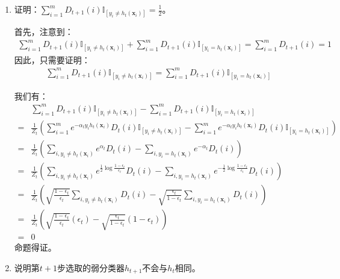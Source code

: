 \documentclass[12pt, a4paper]{article}
\newcommand{\vv}[1]{{\bm{#1}}}
\newcommand{\unit}{{\mathbb{I}}}
\begin{document}
        \begin{enumerate}

        \item 证明：$\sum_{i = 1}^{m} D_{t + 1}(i) \unit_{[y_i \ne h_t(\vv{x}_i)]} = \frac{1}{2}$。

            首先，注意到：
            \begin{align*}
            \sum_{i = 1}^{m} D_{t + 1}(i) \unit_{[y_i \ne h_t(\vv{x}_i)]} + \sum_{i = 1}^{m} D_{t + 1}(i) \unit_{[y_i = h_t(\vv{x}_i)]} = \sum_{i = 1}^{m} D_{t + 1}(i) = 1
            \end{align*}
            因此，只需要证明：
            \begin{align*}
            \sum_{i = 1}^{m} D_{t + 1}(i) \unit_{[y_i \ne h_t(\vv{x}_i)]} = \sum_{i = 1}^{m} D_{t + 1}(i) \unit_{[y_i = h_t(\vv{x}_i)]}
            \end{align*}

            我们有：
            \begin{align*}
            &\sum_{i = 1}^{m} D_{t + 1}(i) \unit_{[y_i \ne h_t(\vv{x}_i)]} - \sum_{i = 1}^{m} D_{t + 1}(i) \unit_{[y_i = h_t(\vv{x}_i)]} \\
            =& \frac{1}{Z_t} (\sum_{i = 1}^{m} e^{-\alpha_t y_i h_t(\vv{x}_i)} D_{t}(i) \unit_{[y_i \ne h_t(\vv{x}_i)]} - \sum_{i = 1}^{m} e^{-\alpha_t y_i h_t(\vv{x}_i)} D_{t}(i) \unit_{[y_i = h_t(\vv{x}_i)]}) \\
            =& \frac{1}{Z_t} (\sum_{i, y_i \ne h_t(\vv{x}_i)} e^{\alpha_t} D_{t}(i) - \sum_{i, y_i = h_t(\vv{x}_i)} e^{-\alpha_t} D_{t}(i)) \\
            =& \frac{1}{Z_t} (\sum_{i, y_i \ne h_t(\vv{x}_i)} e^{\frac{1}{2} \log \frac{1 - \epsilon_t}{\epsilon_t}} D_{t}(i) - \sum_{i, y_i = h_t(\vv{x}_i)} e^{-\frac{1}{2} \log \frac{1 - \epsilon_t}{\epsilon_t}} D_{t}(i)) \\
            =& \frac{1}{Z_t} (\sqrt{\frac{1 - \epsilon_t}{\epsilon_t}} \sum_{i, y_i \ne h_t(\vv{x}_i)} D_{t}(i) - \sqrt{\frac{\epsilon_t}{1 - \epsilon_t}} \sum_{i, y_i = h_t(\vv{x}_i)} D_{t}(i)) \\
            =& \frac{1}{Z_t} (\sqrt{\frac{1 - \epsilon_t}{\epsilon_t}} (\epsilon_t) - \sqrt{\frac{\epsilon_t}{1 - \epsilon_t}} (1 - \epsilon_t)) \\
            =& 0
            \end{align*}
            命题得证。

        \item 说明第$t + 1$步选取的弱分类器$h_{t + 1}$不会与$h_t$相同。


\end{enumerate}
\end{document}
